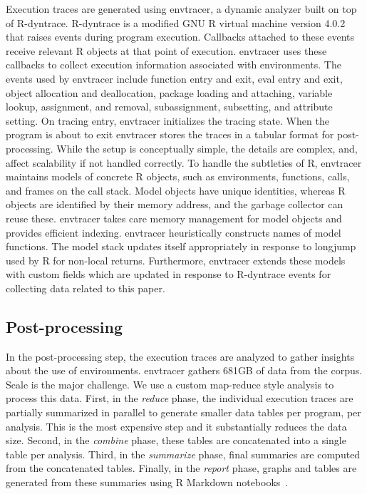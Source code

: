 \documentclass[10pt,review,sigplan,anonymous=true,authorversion=true,nonacm=true]{acmart}
\newcommand{\envtracer}{{\sf envtracer}\xspace}
\newcommand{\rdyntrace}{{\sf R-dyntrace}\xspace}
\begin{document}
Execution traces are generated using \envtracer, a dynamic analyzer built on top
of \rdyntrace. \rdyntrace is a modified GNU R virtual machine version
4.0.2~\cite{oopsla19b} that raises events during program execution. Callbacks
attached to these events receive relevant R objects at that point of execution.
\envtracer uses these callbacks to collect execution information associated with
environments. The events used by \envtracer include function entry and exit,
eval entry and exit, object allocation and deallocation, package loading and
attaching, variable lookup, assignment, and removal, subassignment, subsetting,
and attribute setting. On tracing entry, \envtracer initializes the tracing
state. When the program is about to exit \envtracer stores the traces in a
tabular format for post-processing. While the setup is conceptually simple, the
details are complex, and, affect scalability if not handled correctly. To handle
the subtleties of R, \envtracer maintains models of concrete R objects, such as
environments, functions, calls, and frames on the call stack. Model objects have
unique identities, whereas R objects are identified by their memory address, and
the garbage collector can reuse these. \envtracer takes care memory management
for model objects and provides efficient indexing. \envtracer heuristically
constructs names of model functions. The model stack updates itself
appropriately in response to longjump used by R for non-local returns.
Furthermore, \envtracer extends these models with custom fields which are
updated in response to \rdyntrace events for collecting data related to this
paper.

\subsection{Post-processing}
In the post-processing step, the execution traces are analyzed to gather
insights about the use of environments. \envtracer gathers 681GB of data from
the corpus. Scale is the major challenge. We use a custom map-reduce style
analysis to process this data. First, in the \textit{reduce} phase, the
individual execution traces are partially summarized in parallel to generate
smaller data tables per program, per analysis. This is the most expensive step
and it substantially reduces the data size. Second, in the \textit{combine}
phase, these tables are concatenated into a single table per analysis. Third, in
the \textit{summarize} phase, final summaries are computed from the concatenated
tables. Finally, in the \textit{report} phase, graphs and tables are generated
from these summaries using R Markdown notebooks~\cite{rmdpkg}.
\end{document}
